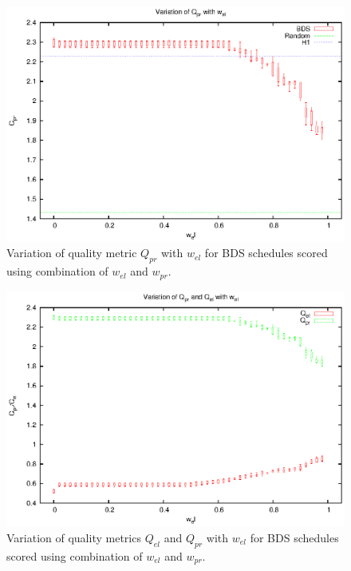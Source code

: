 \begin{figure}[htbp]
\begin{center}
    \includegraphics[scale=1.0, angle=0]{figures/mam/cmp_pr.eps}
    \caption[Variation of $Q_{pr}$ with $w_{el}$.]
      {Variation of quality metric $Q_{pr}$ with $w_{el}$ for BDS schedules scored using combination of $w_{el}$ and $w_{pr}$.}
\label{fig:mam_cmp_pr}
\end{center}
\end{figure}



\begin{figure}[htbp]
\begin{center}
    \includegraphics[scale=1.0, angle=0]{figures/mam/cmp_elpr.eps}
    \caption[Variation of $Q_{el}$ and $Q_{pr}$ with $w_{el}$.]
      {Variation of quality metrics $Q_{el}$ and $Q_{pr}$ with $w_{el}$ for BDS schedules scored using combination of $w_{el}$ and $w_{pr}$.}
\label{fig:mam_cmp_elpr}
\end{center}
\end{figure}

